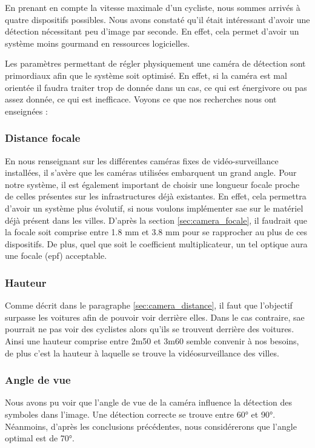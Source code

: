 En prenant en compte la vitesse maximale d'un cycliste, nous sommes arrivés à quatre dispositifs possibles. Nous avons constaté qu'il était intéressant
d'avoir une détection nécessitant peu d'image par seconde. En effet, cela permet d'avoir un système moins gourmand en ressources logicielles.

Les paramètres permettant de régler physiquement une caméra de détection sont primordiaux afin que le système soit optimisé.
En effet, si la caméra est mal orientée il faudra traiter trop de donnée dans un cas, ce qui est énergivore ou pas assez donnée, ce qui est inefficace.
Voyons ce que nos recherches nous ont enseignées :

\subsubsection*{Distance focale}
En nous renseignant sur les différentes caméras fixes de vidéo-surveillance installées, il s’avère que les caméras utilisées embarquent un grand angle.
Pour notre système, il est également important de choisir une longueur focale proche de celles présentes sur les infrastructures déjà existantes.
En effet, cela permettra d'avoir un système plus évolutif, si nous voulons implémenter \gls{sae} sur le matériel déjà présent dans les villes.
D'après la section \ref{sec:camera_focale}, il faudrait que la focale soit comprise entre 1.8 mm et 3.8 mm pour se rapprocher au plus de ces dispositifs.
De plus, quel que soit le coefficient multiplicateur, un tel optique aura une focale (\gls{epf}) acceptable.

\subsubsection*{Hauteur}

Comme décrit dans le paragraphe \ref{sec:camera_distance}, il faut que l'objectif surpasse les voitures afin de pouvoir voir derrière elles.
Dans le cas contraire, \gls{sae} pourrait ne pas voir des cyclistes alors qu'ils se trouvent derrière des voitures.
Ainsi une hauteur comprise entre 2m50 et 3m60 semble convenir à nos besoins, de plus c'est la hauteur à laquelle se trouve la vidéosurveillance des villes.

\subsubsection*{Angle de vue}
Nous avons pu voir que l'angle de vue de la caméra influence la détection des symboles dans l'image. Une détection correcte se trouve entre 60° et 90°.
Néanmoins, d'après les conclusions précédentes, nous considérerons que l'angle optimal est de 70°.

